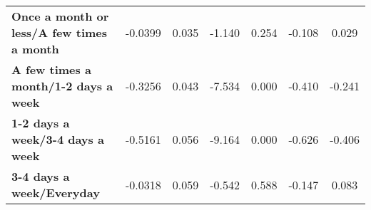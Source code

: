 \documentclass{report}
\begin{document}
\begin{center}
\begin{tabular}{lcccccc}
\textbf{Once a month or less/A few times a month} &      -0.0399  &        0.035     &    -1.140  &         0.254        &       -0.108    &        0.029     \\
\textbf{A few times a month/1-2 days a week}      &      -0.3256  &        0.043     &    -7.534  &         0.000        &       -0.410    &       -0.241     \\
\textbf{1-2 days a week/3-4 days a week}          &      -0.5161  &        0.056     &    -9.164  &         0.000        &       -0.626    &       -0.406     \\
\textbf{3-4 days a week/Everyday}                 &      -0.0318  &        0.059     &    -0.542  &         0.588        &       -0.147    &        0.083     \\
\bottomrule
\end{tabular}
\end{center}
\end{document}
